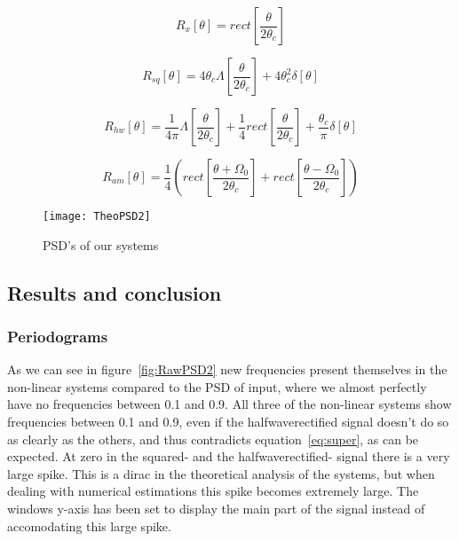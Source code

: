\documentclass[10pt]{article}
\begin{document}
\begin{equation}
  \label{eq:PSDfiltsig}
   R_x[\theta] = rect[\frac{\theta} {2\theta_c}]
\end{equation}

\begin{equation}
  \label{eq:PSDsq}
  R_{sq}[\theta] = 4\theta_c\Lambda[\frac{\theta}{2\theta_c}]+4\theta_c^2\delta[\theta]
\end{equation}

\begin{equation}
  \label{eq:PSDhw}
 R_{hw}[\theta] = \frac{1}{4\pi}\Lambda[\frac{\theta}{2\theta_c}]+\frac{1}{4}rect[\frac{\theta} {2\theta_c}]
+\frac{\theta_c}{\pi}\delta[\theta]
\end{equation}

\begin{equation}
  \label{eq:PSDam}
  R_{am}[\theta] = \frac{1}{4}(rect[\frac{\theta+\Omega_{0}} {2\theta_c}]+rect[\frac{\theta-\Omega_{0}} {2\theta_c}])
\end{equation}

\begin{figure}[!hp]

    \begin{center}
      \texttt{[image: TheoPSD2]}
    \caption{PSD's of our systems \label{fig:theoPSD2}}
    \end{center}

\end{figure}

\subsection{Results and conclusion}

\subsubsection{Periodograms}
As we can see in figure~\ref{fig:RawPSD2} new frequencies present themselves in
the non-linear systems compared to the PSD of input, where we almost perfectly
have no frequencies between 0.1 and 0.9. All three of the non-linear systems show
frequencies between 0.1 and 0.9, even if the halfwaverectified signal doesn't do
so as clearly as the others, and thus contradicts equation~\ref{eq:super}, as can
be expected. At zero in the squared- and the halfwaverectified-
signal there is a very large spike. This is a dirac in the theoretical analysis
of the systems, but when dealing with numerical estimations this spike becomes
extremely large. The windows y-axis has been set to display the main part of the
signal instead of accomodating this large spike.
\end{document}
